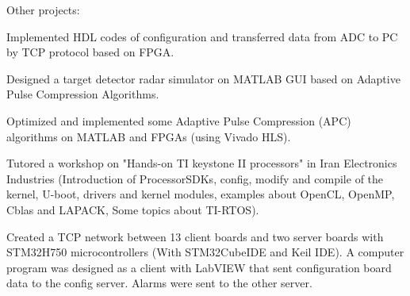 \newpage
{}


\begin{cventries}

  \cventry
    {} %
    {Other projects:} %
    {} %
    {} %
    {
      \begin{cvitems} %
        \item {Implemented HDL codes of configuration and transferred data from ADC to PC by TCP protocol based on FPGA.}
        \item {Designed a target detector radar simulator on MATLAB GUI based on Adaptive Pulse Compression Algorithms.}
        \item {Optimized and implemented some Adaptive Pulse Compression (APC) algorithms on MATLAB and FPGAs (using Vivado HLS).}
	      \item {Tutored a workshop on "Hands-on TI keystone II processors" in Iran Electronics Industries (Introduction of ProcessorSDKs, config, modify and compile of the kernel, U-boot, drivers and kernel modules, examples about OpenCL, OpenMP, Cblas and LAPACK, Some topics about TI-RTOS).}
	      \item {Created a TCP network between 13 client boards and two server boards with STM32H750 microcontrollers (With STM32CubeIDE and Keil IDE). A computer program was designed as a client with LabVIEW that sent configuration board data to the config server. Alarms were sent to the other server.}
      \end{cvitems}
    }

\end{cventries}
